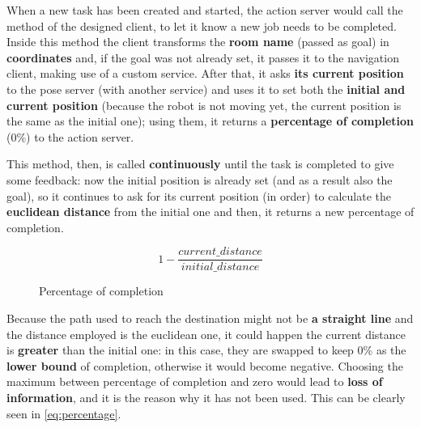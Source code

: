 When a new task has been created and started, the action server would call the  method of the designed client, to let it know a new job needs to be completed.
Inside this method the client transforms the \textbf{room name} (passed as goal) in \textbf{coordinates} and, if the goal was not already set, it passes it to the navigation client, making use of a custom service. After that, it asks \textbf{its current position} to the pose server (with another service) and uses it to set both the \textbf{initial and current position} (because the robot is not moving yet, the current position is the same as the initial one); using them, it returns a \textbf{percentage of completion} (0\%) to the action server.

This method, then, is called \textbf{continuously} until the task is completed to give some feedback: now the initial position is already set (and as a result also the goal), so it continues to ask for its current position (in order) to calculate the \textbf{euclidean distance} from the initial one and then, it returns a new percentage of completion.

\begin{wrapfigure}{r}{0.25\textwidth}
    \begin{equation*}
        1-\dfrac{current\_distance}{initial\_distance}
    \end{equation*}
    \caption{Percentage of completion}
    \label{eq:percentage}
\end{wrapfigure} 

Because the path used to reach the destination might not be \textbf{a straight line} and the distance employed is the euclidean one, it could happen the current distance is \textbf{greater} than the initial one: 
in this case, they are swapped to keep 0\% as the \textbf{lower bound} of completion, otherwise it would become negative. Choosing the maximum between percentage of completion and zero would lead to \textbf{loss of information}, and it is the reason why it has not been used. This can be clearly seen in \autoref{eq:percentage}.